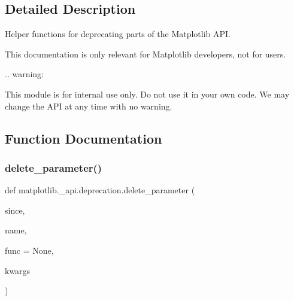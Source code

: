 \subsection{Detailed Description}
\begin{DoxyVerb}Helper functions for deprecating parts of the Matplotlib API.

This documentation is only relevant for Matplotlib developers, not for users.

.. warning:

This module is for internal use only.  Do not use it in your own code.
We may change the API at any time with no warning.\end{DoxyVerb}
 

\subsection{Function Documentation}
\mbox{\label{namespacematplotlib_1_1__api_1_1deprecation_a5014ececfdc3ae49f05309499fe2cc4f}} 
\subsubsection{\texorpdfstring{delete\+\_\+parameter()}{delete\_parameter()}}
{\footnotesize\ttfamily def matplotlib.\+\_\+api.\+deprecation.\+delete\+\_\+parameter (\begin{DoxyParamCaption}\item[{}]{since,  }\item[{}]{name,  }\item[{}]{func = {\ttfamily None},  }\item[{}]{kwargs }\end{DoxyParamCaption})}

